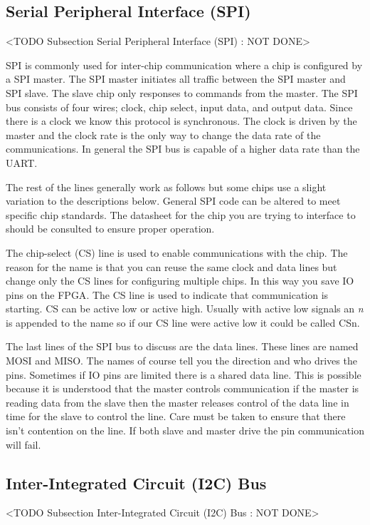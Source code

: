 \subsection{Serial Peripheral Interface (SPI)}
	<TODO Subsection Serial Peripheral Interface (SPI) : NOT DONE>

\ac{SPI} is commonly used for inter-chip communication where a chip is configured by a SPI master. The SPI master initiates all traffic between the SPI master and SPI slave. The slave chip only responses to commands from the master. The SPI bus consists of four wires; clock, chip select, input data, and output data. Since there is a clock we know this protocol is synchronous. The clock is driven by the master and the clock rate is the only way to change the data rate of the communications. In general the \ac{SPI} bus is capable of a higher data rate than the UART.

The rest of the lines generally work as follows but some chips use a slight variation to the descriptions below. General SPI code can be altered to meet specific chip standards. The datasheet for the chip you are trying to interface to should be consulted to ensure proper operation. 

The chip-select (CS) line is used to enable communications with the chip. The reason for the name is that you can reuse the same clock and data lines but change only the CS lines for configuring multiple chips. In this way you save \ac{IO} pins on the \ac{FPGA}. The CS line is used to indicate that communication is starting. \ac{CS} can be active low or active high. Usually with active low signals an \emph{n} is appended to the name so if our CS line were active low it could be called CSn. 

The last lines of the SPI bus to discuss are the data lines. These lines are named \ac{MOSI} and \ac{MISO}. The names of course tell you the direction and who drives the pins. Sometimes if \ac{IO} pins are limited there is a shared data line. This is possible because it is understood that the master controls communication if the master is reading data from the slave then the master releases control of the data line in time for the slave to control the line. Care must be taken to ensure that there isn't contention on the line. If both slave and master drive the pin communication will fail. 	
	
\subsection{Inter-Integrated Circuit (I2C) Bus}
	<TODO Subsection Inter-Integrated Circuit (I2C) Bus : NOT DONE>

